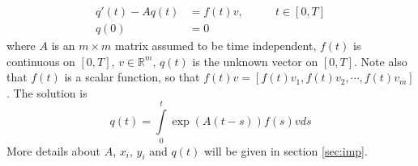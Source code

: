 \begin{equation} \label{eqn:numheat}
\begin{aligned}
q'(t) -Aq(t) &= f(t) v, \qquad & t \in [0,T] \\
q(0) &= 0               
\end{aligned}
\end{equation}
where $A$ is an $m \times m$ matrix assumed to be time independent, $f(t)$ is continuous on $[0,T]$, $v \in \mathbb{R}^m$, $q(t)$ is the unknown vector on $[0,T]$. Note also that $f(t)$ is a scalar function, so that $f(t) v = [f(t)v_1,f(t)v_2, \cdots,f(t) v_m] $.
The solution is 
\begin{equation*}
q(t) = \int \limits_0^t \exp(A(t-s))f(s)v ds
\end{equation*}
More details about $A$, $x_i$, $y_i$ and $q(t)$ will be given in section \ref{sec:imp}.
